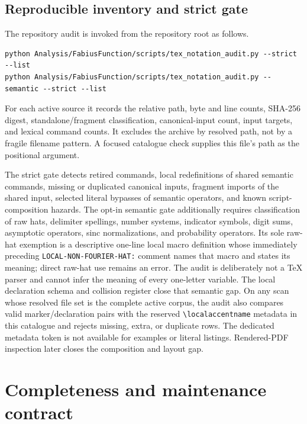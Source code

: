 \documentclass[11pt,oneside]{article}
\theoremstyle{definition}
\theoremstyle{remark}
\DeclareRobustCommand{\commandname}[1]{\texttt{\textbackslash#1}}
\begin{document}
\subsection{Reproducible inventory and strict gate}

The repository audit is invoked from the repository root as follows.

\begin{lstlisting}[style=pseudo]
python Analysis/FabiusFunction/scripts/tex_notation_audit.py --strict --list
python Analysis/FabiusFunction/scripts/tex_notation_audit.py --semantic --strict --list
\end{lstlisting}

For each active source it records the relative path, byte and line counts, SHA-256 digest,
standalone/fragment classification, canonical-input count, input targets, and lexical
command counts.  It excludes the archive by resolved path, not by a fragile filename
pattern.  A focused catalogue check supplies this file's path as the positional argument.

The strict gate detects retired commands, local redefinitions of shared semantic
commands, missing or duplicated canonical inputs, fragment imports of the shared input,
selected literal bypasses of semantic operators, and known script-composition hazards.
The opt-in semantic gate additionally requires classification of raw hats, delimiter
spellings, number systems, indicator symbols, digit sums, asymptotic operators, sinc
normalizations, and probability operators.  Its sole raw-hat exemption is a descriptive
one-line local macro definition whose immediately preceding
\texttt{LOCAL-NON-FOURIER-HAT:} comment names that macro and states its meaning; direct
raw-hat use remains an error.  The audit is deliberately not a TeX parser and cannot infer
the meaning of every one-letter variable.  The local declaration schema and collision
register close that semantic gap.  On any scan whose resolved file set is the complete
active corpus, the audit also compares valid marker/declaration pairs with the reserved
\commandname{localaccentname} metadata in this catalogue and rejects missing, extra, or
duplicate rows.  The dedicated metadata token is not available for examples or literal
listings.  Rendered-PDF inspection later closes the composition and layout gap.

\section{Completeness and maintenance contract}
\label{sec:maintenance}
\end{document}

